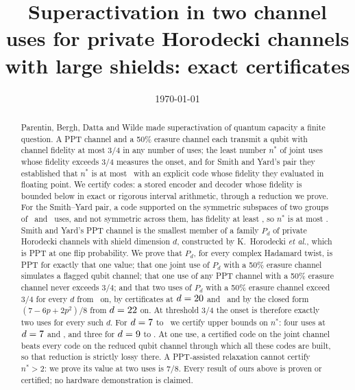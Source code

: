 \documentclass[aps,pra,twocolumn,superscriptaddress,nofootinbib,longbibliography,floatfix]{revtex4-2}
\begin{document}
\title{Superactivation in two channel uses for private Horodecki channels with large shields: exact certificates}

\OwnerAuthor
\OwnerAffiliation

\date{\today}

\begin{abstract}
Parentin, Bergh, Datta and Wilde made superactivation of quantum capacity a finite question. A PPT channel and a 50\% erasure channel each transmit a qubit with channel fidelity at most 3/4 in any number of uses; the least number $n^*$ of joint uses whose fidelity exceeds 3/4 measures the onset, and for Smith and Yard's pair they established that $n^*$ is at most \PubN\ with an explicit code whose fidelity they evaluated in floating point. We certify codes: a stored encoder and decoder whose fidelity is bounded below in exact or rigorous interval arithmetic, through a reduction we prove. For the Smith--Yard pair, a code supported on the symmetric subspaces of two groups of \TgFifteenA\ and \TgFifteenB\ uses, and not symmetric across them, has fidelity at least \TgFifteenF, so $n^*$ is at most \TgFifteenN. Smith and Yard's PPT channel is the smallest member of a family $P_d$ of private Horodecki channels with shield dimension $d$, constructed by K.~Horodecki \textit{et al.}, which is PPT at one flip probability. We prove that $P_d$, for every complex Hadamard twist, is PPT for exactly that one value; that one joint use of $P_d$ with a 50\% erasure channel simulates a flagged qubit channel; that one use of any PPT channel with a 50\% erasure channel never exceeds 3/4; and that two uses of $P_d$ with a 50\% erasure channel exceed 3/4 for every $d$ from \TwoUseDmin\ on, by certificates at $d=20$ and \TwoUseDnext\ and by the closed form $(7-6p+2p^2)/8$ from $d=22$ on. At threshold 3/4 the onset is therefore exactly two uses for every such $d$. For $d=7$ to \OnsetCertHi\ we certify upper bounds on $n^*$: four uses at $d=7$ and \OnsetFourHi, and three for $d=9$ to \OnsetThreeHi. At one use, a certified code on the joint channel beats every code on the reduced qubit channel through which all these codes are built, so that reduction is strictly lossy there. A PPT-assisted relaxation cannot certify $n^*>2$: we prove its value at two uses is 7/8. Every result of ours above is proven or certified; no hardware demonstration is claimed.
\end{abstract}

\maketitle
\end{document}
